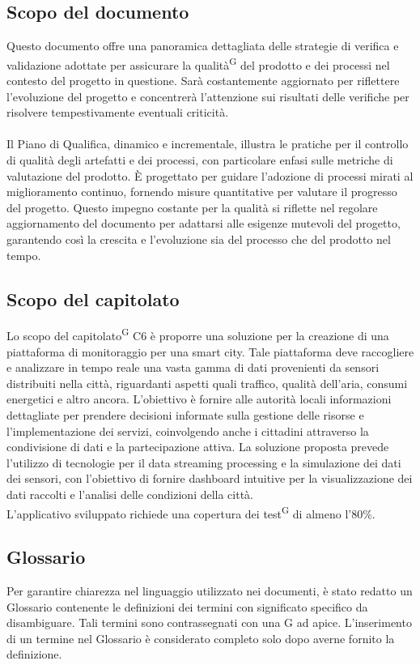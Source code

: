 \documentclass[8pt]{article}
\newcommand{\glossterm}[1]{#1\textsuperscript{G}} %
\begin{document}
\subsection{Scopo del documento}
Questo documento offre una panoramica dettagliata delle strategie di verifica e validazione adottate per assicurare la \glossterm{qualità} del prodotto e dei processi nel contesto del progetto in questione. Sarà costantemente aggiornato per riflettere l'evoluzione del progetto e concentrerà l'attenzione sui risultati delle verifiche per risolvere tempestivamente eventuali criticità.
\\\\
Il Piano di Qualifica, dinamico e incrementale, illustra le pratiche per il controllo di qualità degli artefatti e dei processi, con particolare enfasi sulle metriche di valutazione del prodotto. È progettato per guidare l'adozione di processi mirati al miglioramento continuo, fornendo misure quantitative per valutare il progresso del progetto. Questo impegno costante per la qualità si riflette nel regolare aggiornamento del documento per adattarsi alle esigenze mutevoli del progetto, garantendo così la crescita e l'evoluzione sia del processo che del prodotto nel tempo.
\subsection{Scopo del capitolato}
Lo scopo del \glossterm{capitolato} C6 è proporre una soluzione per la creazione di una piattaforma di monitoraggio per una smart city. Tale piattaforma deve raccogliere e analizzare in tempo reale una vasta gamma di dati provenienti da sensori distribuiti nella città, riguardanti aspetti quali traffico, qualità dell'aria, consumi energetici e altro ancora. L'obiettivo è fornire alle autorità locali informazioni dettagliate per prendere decisioni informate sulla gestione delle risorse e l'implementazione dei servizi, coinvolgendo anche i cittadini attraverso la condivisione di dati e la partecipazione attiva. La soluzione proposta prevede l'utilizzo di tecnologie per il data streaming processing e la simulazione dei dati dei sensori, con l'obiettivo di fornire dashboard intuitive per la visualizzazione dei dati raccolti e l'analisi delle condizioni della città.\\
L’applicativo sviluppato richiede una copertura dei \glossterm{test} di almeno l’80\%.

\subsection{Glossario}
Per garantire chiarezza nel linguaggio utilizzato nei documenti, è stato redatto un Glossario contenente le definizioni dei termini con significato specifico da disambiguare. Tali termini sono contrassegnati con una G ad apice. L'inserimento di un termine nel Glossario è considerato completo solo dopo averne fornito la definizione.
\end{document}
